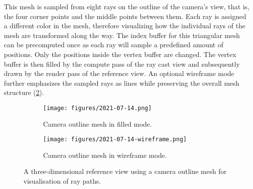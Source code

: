 This mesh is sampled from eight rays on the outline of the camera's view, that is, the four corner points and the middle points between them.
Each ray is assigned a different color in the mesh, therefore visualizing how the individual rays of the mesh are transformed along the way.
The index buffer for this triangular mesh can be precomputed once as each ray will sample a predefined amount of positions.
Only the positions inside the vertex buffer are changed.
The vertex buffer is then filled by the compute pass of the ray cast view and subsequently drawn by the render pass of the reference view.
An optional wireframe mode further emphasizes the sampled rays as lines while preserving the overall mesh structure (\cref{fig:reference-view-3d-mesh-wireframe}).

\begin{figure}[!t]
\centering
\begin{subfigure}{0.48\linewidth}
    \texttt{[image: figures/2021-07-14.png]}
    \caption{Camera outline mesh in filled mode.}
    \label{fig:reference-view-3d-mesh-full}
\end{subfigure}
\begin{subfigure}{0.48\linewidth}
    \texttt{[image: figures/2021-07-14-wireframe.png]}
    \caption{Camera outline mesh in wireframe mode.}
    \label{fig:reference-view-3d-mesh-wireframe}
\end{subfigure}
  \caption{A three-dimensional reference view using a camera outline mesh for visualisation of ray paths.}
  \label{fig:reference-view-3d-mesh}
\end{figure}

